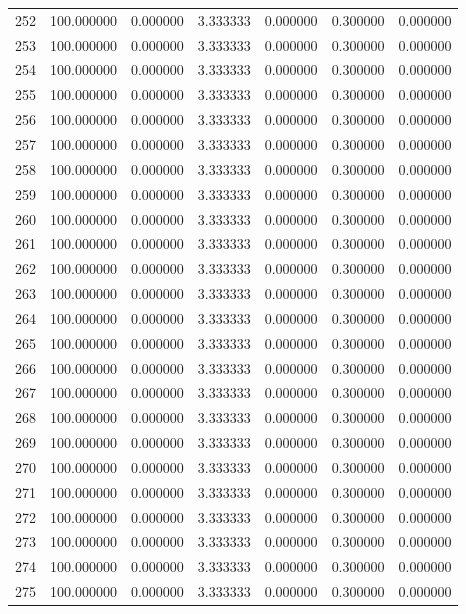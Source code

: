 \begin{tabular}{rrrrrrr}
252 & 100.000000 &    0.000000 &  3.333333 &    0.000000 &    0.300000 &  0.000000 \\
253 & 100.000000 &    0.000000 &  3.333333 &    0.000000 &    0.300000 &  0.000000 \\
254 & 100.000000 &    0.000000 &  3.333333 &    0.000000 &    0.300000 &  0.000000 \\
255 & 100.000000 &    0.000000 &  3.333333 &    0.000000 &    0.300000 &  0.000000 \\
256 & 100.000000 &    0.000000 &  3.333333 &    0.000000 &    0.300000 &  0.000000 \\
257 & 100.000000 &    0.000000 &  3.333333 &    0.000000 &    0.300000 &  0.000000 \\
258 & 100.000000 &    0.000000 &  3.333333 &    0.000000 &    0.300000 &  0.000000 \\
259 & 100.000000 &    0.000000 &  3.333333 &    0.000000 &    0.300000 &  0.000000 \\
260 & 100.000000 &    0.000000 &  3.333333 &    0.000000 &    0.300000 &  0.000000 \\
261 & 100.000000 &    0.000000 &  3.333333 &    0.000000 &    0.300000 &  0.000000 \\
262 & 100.000000 &    0.000000 &  3.333333 &    0.000000 &    0.300000 &  0.000000 \\
263 & 100.000000 &    0.000000 &  3.333333 &    0.000000 &    0.300000 &  0.000000 \\
264 & 100.000000 &    0.000000 &  3.333333 &    0.000000 &    0.300000 &  0.000000 \\
265 & 100.000000 &    0.000000 &  3.333333 &    0.000000 &    0.300000 &  0.000000 \\
266 & 100.000000 &    0.000000 &  3.333333 &    0.000000 &    0.300000 &  0.000000 \\
267 & 100.000000 &    0.000000 &  3.333333 &    0.000000 &    0.300000 &  0.000000 \\
268 & 100.000000 &    0.000000 &  3.333333 &    0.000000 &    0.300000 &  0.000000 \\
269 & 100.000000 &    0.000000 &  3.333333 &    0.000000 &    0.300000 &  0.000000 \\
270 & 100.000000 &    0.000000 &  3.333333 &    0.000000 &    0.300000 &  0.000000 \\
271 & 100.000000 &    0.000000 &  3.333333 &    0.000000 &    0.300000 &  0.000000 \\
272 & 100.000000 &    0.000000 &  3.333333 &    0.000000 &    0.300000 &  0.000000 \\
273 & 100.000000 &    0.000000 &  3.333333 &    0.000000 &    0.300000 &  0.000000 \\
274 & 100.000000 &    0.000000 &  3.333333 &    0.000000 &    0.300000 &  0.000000 \\
275 & 100.000000 &    0.000000 &  3.333333 &    0.000000 &    0.300000 &  0.000000 \\
\bottomrule
\end{tabular}
